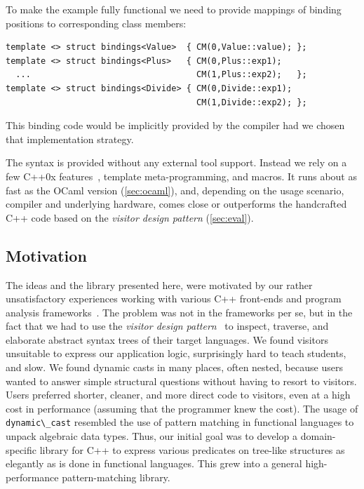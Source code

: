 \documentclass[preprint]{sigplanconf}
\makeatletter
\DeclareRobustCommand{\code}[1]{{\lstinline[breaklines=false,escapechar=@]{#1}}}
\makeatother
\begin{document}
\noindent
To make the example fully functional we need to provide mappings of binding 
positions to corresponding class members:

\begin{lstlisting}[keepspaces,columns=flexible]
template <> struct bindings<Value>  { CM(0,Value::value); };
template <> struct bindings<Plus>   { CM(0,Plus::exp1); 
  ...                                 CM(1,Plus::exp2);   };
template <> struct bindings<Divide> { CM(0,Divide::exp1); 
                                      CM(1,Divide::exp2); };
\end{lstlisting}

\noindent
This binding code would be implicitly provided by the compiler had
we chosen that implementation strategy.

The syntax is provided without any external tool support. Instead we rely on a 
few C++0x features~\cite{C++0x}, template meta-programming, and macros. It runs 
about as fast as the OCaml version (\textsection\ref{sec:ocaml}), and, depending 
on the usage scenario, compiler and underlying hardware, comes close or 
outperforms the handcrafted C++ code based on the \emph{visitor design pattern} 
(\textsection\ref{sec:eval}).

\subsection{Motivation}

The ideas and the library presented here, were motivated by our 
rather unsatisfactory experiences working with various C++ front-ends and 
program analysis frameworks~\cite{Pivot09,Phoenix,Clang,Lise}. 
The problem was not in the frameworks per se, but in the fact that we had to use
the \emph{visitor design pattern}~\cite{DesignPatterns1993} to inspect, traverse, and 
elaborate abstract syntax trees of their target languages. We found visitors 
unsuitable to express our application logic, surprisingly hard to teach 
students, and slow. We found dynamic casts in many places, often nested, 
because users wanted to answer simple structural 
questions without having to resort to visitors. Users preferred shorter, cleaner, 
and more direct code to visitors, even at a high cost in performance (assuming 
that the programmer knew the cost). The usage of \code{dynamic\_cast} resembled 
the use of pattern matching in functional languages to unpack algebraic data 
types. Thus, our initial goal was to develop a domain-specific library for C++ 
to express various predicates on tree-like structures as elegantly as is done in functional 
languages. This grew into a general high-performance pattern-matching library.
\end{document}
